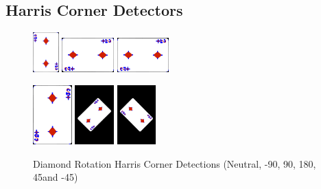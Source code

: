 \documentclass[conference]{IEEEtran}
\begin{document}
\subsection{Harris Corner Detectors}
\begin{figure}[H]
    \centerline{
        {\includegraphics[width=10mm, scale=0.5]{./figures/Harris Corner/diamondNeutral Corners.png}}
        {\includegraphics[width=20mm, scale=0.5]{./figures/Harris Corner/diamondDeg 90 Corners.png}}
        {\includegraphics[width=20mm, scale=0.5]{./figures/Harris Corner/diamondDeg -90 Corners.png}}
    }
    \centerline{
        {\includegraphics[width=15mm, scale=0.5]{./figures/Harris Corner/diamond180 Deg Corners.png}}
        {\includegraphics[width=15mm, scale=0.5]{./figures/Harris Corner/diamondDeg -45 Corners.png}}
        {\includegraphics[width=15mm, scale=0.5]{./figures/Harris Corner/diamondDeg 45 Corners.png}}
    }
    \caption{Diamond Rotation Harris Corner Detections (Neutral, -90\degree, 90\degree, 180\degree, 45\degree and -45\degree)}
    \label{fig}
\end{figure}
\end{document}
